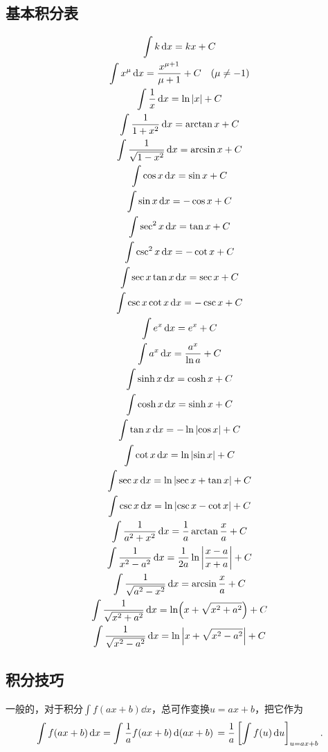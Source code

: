 \subsection{基本积分表}
\begingroup
\def\intx#1{\int #1\dd{x}}%
\begin{gather}
	\intx{k} = kx + C \\
	\intx{x^\mu} = \frac{x^{\mu + 1}}{\mu + 1} + C \quad (\mu \neq -1) \\
	\intx{\frac{1}{x}} = \ln\abs{x} + C \\
	\intx{\frac{1}{1 + x^2}} = \arctan x + C \\
	\intx{\frac{1}{\sqrt{1 - x^2}}} = \arcsin x + C \\
	\intx{\cos x} = \sin x + C \\
	\intx{\sin x} = -\cos x + C \\
	\intx{\sec^2 x} = \tan x + C \\
	\intx{\csc^2 x} = -\cot x + C \\
	\intx{\sec x \tan x} = \sec x + C \\
	\intx{\csc x \cot x} = -\csc x + C \\
	\intx{e^x} = e^x + C \\
	\intx{a^x} = \frac{a^x}{\ln a} + C \\
	\intx{\sinh x} = \cosh x + C \\
	\intx{\cosh x} = \sinh x + C \\
	\intx{\tan x} = -\ln\abs{\cos x} + C \\
	\intx{\cot x} = \ln\abs{\sin x} + C \\
	\intx{\sec x} = \ln\abs{\sec x + \tan x} + C \\
	\intx{\csc x} = \ln\abs{\csc x - \cot x} + C \\
	\intx{\frac{1}{a^2 + x^2}} = \frac{1}{a} \arctan\frac{x}{a} + C \\
	\intx{\frac{1}{x^2 - a^2}} = \frac{1}{2a} \ln\abs{\frac{x - a}{x + a}} + C \\
	\intx{\frac{1}{\sqrt{a^2 - x^2}}} = \arcsin\frac{x}{a} + C \\
	\intx{\frac{1}{\sqrt{x^2 + a^2}}} = \ln(x + \sqrt{x^2 + a^2}) + C \\
	\intx{\frac{1}{\sqrt{x^2 - a^2}}} = \ln\abs{x + \sqrt{x^2 - a^2}} + C
\end{gather}
\endgroup

\subsection{积分技巧}
一般的，对于积分\(\int f(ax+b) \dd{x}\)，总可作变换\(u=ax+b\)，把它作为\[
	\int f(ax+b) \dd{x}
	= \int \frac{1}{a} f(ax+b) \dd{(ax+b)} \\
	= \frac{1}{a} \left[ \int f(u) \dd{u} \right]_{u=ax+b}.
\]

